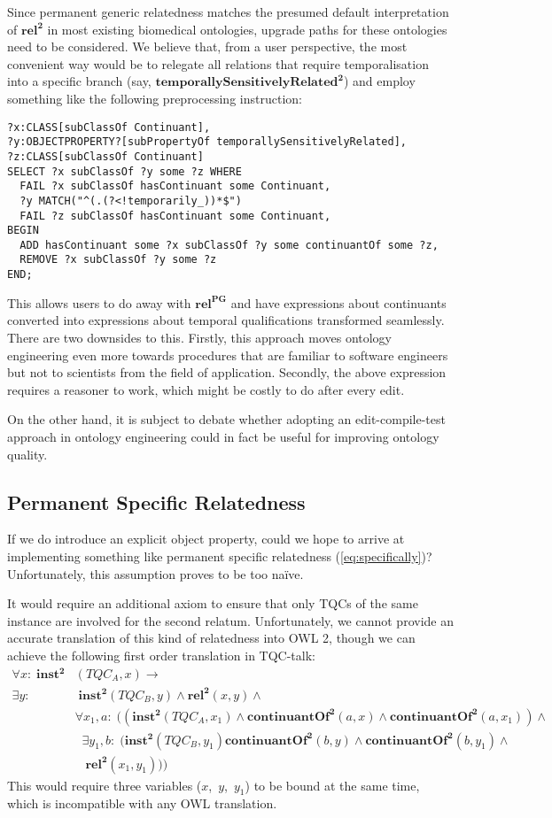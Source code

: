 \documentclass{ao2e}
\newcommand{\mirel}[1]{\ensuremath{\mathrm{\mathbf{#1}}}}
\newcommand{\mclass}[1]{\ensuremath{\mathit{#1}}}
\newcommand{\mrel}[2]{\mirel{#1^#2}}
\newcommand{\mrelb}[1]{\mrel{#1}{2}}
\newcommand{\TQC}[1]{\ensuremath{TQC_{\mclass{#1}}}}
\newcommand{\mrelpg}[1]{\mrel{#1}{{PG}}}
\begin{document}
Since permanent generic relatedness matches the presumed default interpretation
of \mrelb{rel} in most existing biomedical ontologies, upgrade paths for these
ontologies need to be considered. We believe that, from a user perspective, the
most convenient way would be to relegate all relations that require
temporalisation into a specific branch (say,
\mrelb{temporallySensitivelyRelated}) and employ something like the following 
preprocessing instruction:
\begin{lstlisting}
?x:CLASS[subClassOf Continuant],
?y:OBJECTPROPERTY?[subPropertyOf temporallySensitivelyRelated],
?z:CLASS[subClassOf Continuant] 
SELECT ?x subClassOf ?y some ?z WHERE 
  FAIL ?x subClassOf hasContinuant some Continuant,
  ?y MATCH("^(.(?<!temporarily_))*$")
  FAIL ?z subClassOf hasContinuant some Continuant,
BEGIN
  ADD hasContinuant some ?x subClassOf ?y some continuantOf some ?z,
  REMOVE ?x subClassOf ?y some ?z
END;
\end{lstlisting}
This allows users to do away with \mrelpg{rel} and have expressions about
continuants converted into expressions about temporal qualifications transformed
seamlessly. There are two downsides to this. Firstly, this approach moves
ontology engineering even more towards procedures that are familiar to
software engineers but not to scientists from the field of application.
Secondly, the above expression requires a reasoner to work, which might be
costly to do after every edit.

On the other hand, it is subject to debate whether adopting an edit-compile-test
approach in ontology engineering could in fact be useful for improving ontology quality.
\subsection{Permanent Specific Relatedness}
If we do introduce an explicit object property, could we hope to arrive at
implementing something like permanent specific relatedness
(\ref{eq:specifically})? Unfortunately, this assumption proves to be too naïve.

It would require an additional axiom to ensure that only TQCs of the same instance are involved
for the second relatum. Unfortunately, we cannot provide an
accurate translation of this kind of relatedness into OWL 2, though we can
achieve the following first order translation in TQC-talk:
 \begin{equation}
\begin{split}
\forall x:\; \mrelb{inst}&(\TQC{A},x) \rightarrow \\
 \exists y:&\;\mrelb{inst}(\TQC{B},y) \wedge \mrelb{rel}(x,y)\wedge\\
 & \forall x_1,a:\; ((\mrelb{inst}(\TQC{A},x_1) \wedge 
\mrelb{continuantOf}(a,x) \wedge \mrelb{continuantOf}(a,x_1))\wedge\\
&\;\;\exists y_1,b:\;(\mrelb{inst}(\TQC{B},y_1) \mrelb{continuantOf}(b,y)  
\wedge \mrelb{continuantOf}(b,y_1) \wedge\\&\;\;\;\mrelb{rel}(x_1,y_1)))
\end{split}
\end{equation}
This would require three variables ($x$,~$y$,~$y_1$) to be bound at the same
time, which is incompatible with any OWL translation.
\end{document}
